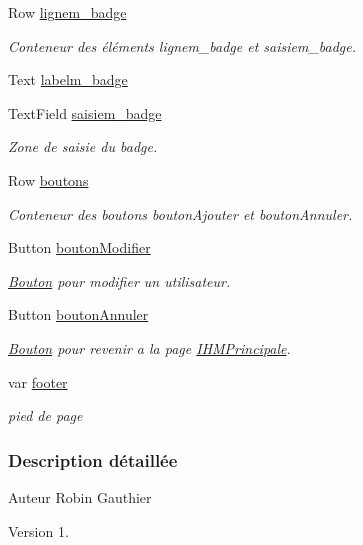 \begin{DoxyCompactItemize}
Row \hyperlink{class_modification_utilisateur_aab94a5acdf400495dff1c55be3ce2ed0}{lignem\+\_\+badge}
\begin{DoxyCompactList}\small\item\em Conteneur des éléments lignem\+\_\+badge et saisiem\+\_\+badge. \end{DoxyCompactList}\item 
Text \hyperlink{class_modification_utilisateur_a06f4d5e8b2047ef096995765ba60ed52}{labelm\+\_\+badge}
\item 
Text\+Field \hyperlink{class_modification_utilisateur_affd0e2bdadcec3795baa4881e27426f6}{saisiem\+\_\+badge}
\begin{DoxyCompactList}\small\item\em Zone de saisie du badge. \end{DoxyCompactList}\item 
Row \hyperlink{class_modification_utilisateur_a541198a28f25630f4ead85b3cb9d4ab4}{boutons}
\begin{DoxyCompactList}\small\item\em Conteneur des boutons bouton\+Ajouter et bouton\+Annuler. \end{DoxyCompactList}\item 
Button \hyperlink{class_modification_utilisateur_a09e871010faff061ee0c8eccd385a1da}{bouton\+Modifier}
\begin{DoxyCompactList}\small\item\em \hyperlink{class_bouton}{Bouton} pour modifier un utilisateur. \end{DoxyCompactList}\item 
Button \hyperlink{class_modification_utilisateur_a18928e4a9d7bb4f9dfaf4ce8ecc5faec}{bouton\+Annuler}
\begin{DoxyCompactList}\small\item\em \hyperlink{class_bouton}{Bouton} pour revenir a la page \hyperlink{class_i_h_m_principale}{I\+H\+M\+Principale}. \end{DoxyCompactList}\item 
var \hyperlink{class_modification_utilisateur_a77ac30e1bcbaa1c2884d332c08a2b3c5}{footer}
\begin{DoxyCompactList}\small\item\em pied de page \end{DoxyCompactList}\end{DoxyCompactItemize}


\subsubsection{Description détaillée}
\begin{DoxyAuthor}{Auteur}
Robin Gauthier
\end{DoxyAuthor}
\begin{DoxyVersion}{Version}
1. 
\end{DoxyVersion}


